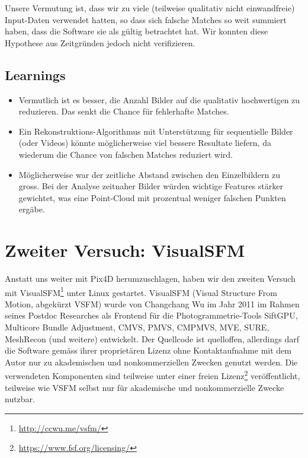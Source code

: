 Unsere Vermutung ist, dass wir zu viele (teilweise qualitativ nicht
einwandfreie) Input-Daten verwendet hatten, so dass sich falsche Matches so weit
summiert haben, dass die Software sie als gültig betrachtet hat. Wir konnten
diese Hypothese aus Zeitgründen jedoch nicht verifizieren.

\subsection{Learnings}

\begin{itemize}
	\item Vermutlich ist es besser, die Anzahl Bilder auf die qualitativ
		hochwertigen zu reduzieren. Das senkt die Chance für fehlerhafte Matches.
	\item Ein Rekonstruktions-Algorithmus mit Unterstützung für sequentielle
		Bilder (oder Videos) könnte möglicherweise viel bessere Resultate liefern,
		da wiederum die Chance von falschen Matches reduziert wird.
	\item Möglicherweise war der zeitliche Abstand zwischen den Einzelbildern
		zu gross. Bei der Analyse zeitnaher Bilder würden wichtige Features
		stärker gewichtet, was eine Point-Cloud mit prozentual weniger
		falschen Punkten ergäbe.
\end{itemize}


\section{Zweiter Versuch: VisualSFM}

\label{workflow:vsfm}

Anstatt uns weiter mit Pix4D herumzuschlagen, haben wir den zweiten Versuch mit
VisualSFM\footnote{\url{http://ccwu.me/vsfm/}}\cite{wu:2011}\cite{wu:2015} unter
Linux gestartet. VisualSFM (Visual Structure From Motion, abgekürzt VSFM) wurde
von Changchang Wu im Jahr 2011 im Rahmen seines Postdoc Researches als Frontend
für die Photogrammetrie-Tools SiftGPU\cite{siftgpu07wu}, Multicore Bundle
Adjustment\cite{wu2011multicore}, CMVS\cite{Furu:2010},
PMVS\cite{Furu:2010:PMVS}, CMPMVS\cite{jancosek2011multi}, MVE\cite{FG-GCH2014},
SURE\cite{rothermel2012sure}, MeshRecon (und weitere) entwickelt. Der Quellcode
ist quelloffen, allerdings darf die Software gemäss ihrer proprietären Lizenz
ohne Kontaktaufnahme mit dem Autor nur zu akademischen und nonkommerziellen
Zwecken genutzt werden. Die verwendeten Komponenten sind teilweise unter einer
freien Lizenz\footnote{\url{https://www.fsf.org/licensing/}} veröffentlicht,
teilweise wie VSFM selbst nur für akademische und nonkommerzielle Zwecke
nutzbar.

